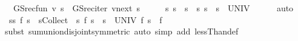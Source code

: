 \begin{isabellebody}
\ \ \ {\isachardoublequoteopen}GS{\isacharunderscore}{\kern0pt}rec{\isacharunderscore}{\kern0pt}fun\ v\ s\ {\isacharequal}{\kern0pt}\ GS{\isacharunderscore}{\kern0pt}rec{\isacharunderscore}{\kern0pt}iter\ v{\isacharunderscore}{\kern0pt}next\ s{\isachardoublequoteclose}\isanewline
%
\isadelimproof
%
\endisadelimproof
%
\isatagproof
{}\isamarkupfalse%
\ {\isacharminus}{\kern0pt}\isanewline
\ \ \isamarkupfalse%
\ {\isachardoublequoteopen}{\isacharbraceleft}{\kern0pt}s{\isacharprime}{\kern0pt}{\isachardot}{\kern0pt}\ s{\isacharprime}{\kern0pt}\ {\isacharless}{\kern0pt}\ s{\isacharbraceright}{\kern0pt}\ {\isasymunion}\ {\isacharbraceleft}{\kern0pt}s{\isacharprime}{\kern0pt}{\isachardot}{\kern0pt}\ s\ {\isasymle}\ s{\isacharprime}{\kern0pt}{\isacharbraceright}{\kern0pt}\ {\isacharequal}{\kern0pt}\ UNIV{\isachardoublequoteclose}\isanewline
\ \ \ \ \isamarkupfalse%
\ auto\isanewline
\ \ \isamarkupfalse%
\ {\isacharasterisk}{\kern0pt}{\isacharcolon}{\kern0pt}\ {\isachardoublequoteopen}{\isacharparenleft}{\kern0pt}{\isasymSum}s{\isacharprime}{\kern0pt}{\isacharless}{\kern0pt}s{\isachardot}{\kern0pt}\ f\ s{\isacharprime}{\kern0pt}{\isacharparenright}{\kern0pt}\ {\isacharplus}{\kern0pt}\ {\isacharparenleft}{\kern0pt}{\isasymSum}s{\isacharprime}{\kern0pt}{\isasymin}Collect\ {\isacharparenleft}{\kern0pt}{\isacharparenleft}{\kern0pt}{\isasymle}{\isacharparenright}{\kern0pt}\ s{\isacharparenright}{\kern0pt}{\isachardot}{\kern0pt}\ f\ s{\isacharprime}{\kern0pt}{\isacharparenright}{\kern0pt}\ {\isacharequal}{\kern0pt}\ {\isacharparenleft}{\kern0pt}{\isasymSum}s{\isacharprime}{\kern0pt}\ {\isasymin}\ UNIV{\isachardot}{\kern0pt}\ f\ s{\isacharprime}{\kern0pt}{\isacharparenright}{\kern0pt}{\isachardoublequoteclose}\ \ f\isanewline
\ \ \ \ \isamarkupfalse%
\ {\isacharparenleft}{\kern0pt}subst\ sum{\isachardot}{\kern0pt}union{\isacharunderscore}{\kern0pt}disjoint{\isacharbrackleft}{\kern0pt}symmetric{\isacharbrackright}{\kern0pt}{\isacharparenright}{\kern0pt}\ {\isacharparenleft}{\kern0pt}auto\ simp\ add{\isacharcolon}{\kern0pt}\ lessThan{\isacharunderscore}{\kern0pt}def{\isacharparenright}{\kern0pt}\isanewline
\ \ \isamarkupfalse%

\end{isabellebody}
